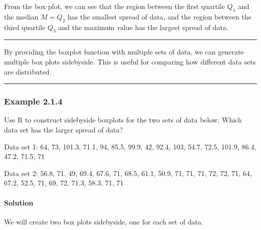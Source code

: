 \documentclass[letterpaper,10pt,english]{jupyterBook}
\begin{document}
\sphinxAtStartPar
From the box plot, we can see that the region between the first quartile \(Q_1\) and the median \(M = Q_2\) has the smallest spread of data, and the region between the third quartile \(Q_3\) and the maximum value has the largest spread of data.


\bigskip\hrule\bigskip


\sphinxAtStartPar
By providing the boxplot function with multiple sets of data, we can generate multiple box plots side\sphinxhyphen{}by\sphinxhyphen{}side. This is useful for comparing how different data sets are distributed.


\bigskip\hrule\bigskip



\subsubsection{Example 2.1.4}
\label{\detokenize{Ch2 Descriptive Statistics/2.1 Measures of Position:example-2-1-4}}
\sphinxAtStartPar
Use R to construct side\sphinxhyphen{}by\sphinxhyphen{}side boxplots for the two sets of data below. Which data set has the larger spread of data?

\sphinxAtStartPar
Data set 1:
64, 73, 101.3, 71.1, 94, 85.5, 99.9, 42, 92.4, 103, 54.7, 72.5, 101.9, 86.4, 47.2, 71.5, 71

\sphinxAtStartPar
Data set 2:
56.8, 71, 49, 69.4, 67.6, 71, 68.5, 61.1, 50.9, 71, 71, 71, 72, 72, 71, 64, 67.2, 52.5, 71, 69, 72, 71.3, 58.3, 71, 71


\paragraph{Solution}
\label{\detokenize{Ch2 Descriptive Statistics/2.1 Measures of Position:id3}}
\sphinxAtStartPar
We will create two box plots side\sphinxhyphen{}by\sphinxhyphen{}side, one for each set of data.
\end{document}
